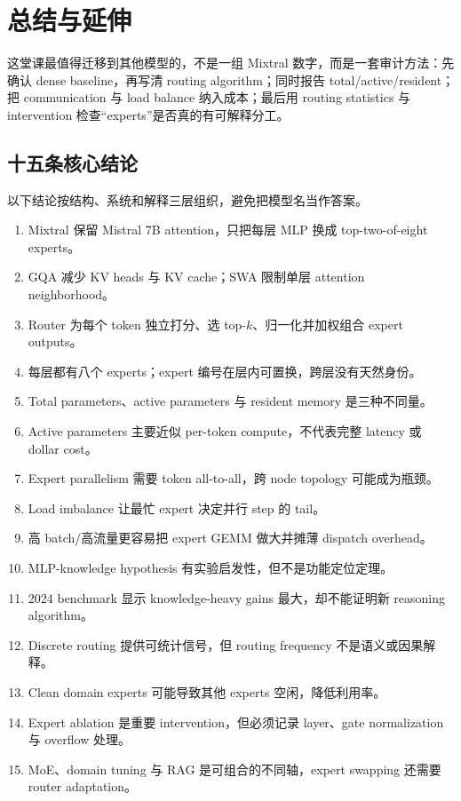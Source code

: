 \section{总结与延伸}

这堂课最值得迁移到其他模型的，不是一组 Mixtral 数字，而是一套审计方法：先确认 dense baseline，再写清 routing algorithm；同时报告 total/active/resident；把 communication 与 load balance 纳入成本；最后用 routing statistics 与 intervention 检查“experts”是否真的有可解释分工。

\subsection{十五条核心结论}

以下结论按结构、系统和解释三层组织，避免把模型名当作答案。

\begin{enumerate}
  \item Mixtral 保留 Mistral 7B attention，只把每层 MLP 换成 top-two-of-eight experts。
  \item GQA 减少 KV heads 与 KV cache；SWA 限制单层 attention neighborhood。
  \item Router 为每个 token 独立打分、选 top-$k$、归一化并加权组合 expert outputs。
  \item 每层都有八个 experts；expert 编号在层内可置换，跨层没有天然身份。
  \item Total parameters、active parameters 与 resident memory 是三种不同量。
  \item Active parameters 主要近似 per-token compute，不代表完整 latency 或 dollar cost。
  \item Expert parallelism 需要 token all-to-all，跨 node topology 可能成为瓶颈。
  \item Load imbalance 让最忙 expert 决定并行 step 的 tail。
  \item 高 batch/高流量更容易把 expert GEMM 做大并摊薄 dispatch overhead。
  \item MLP-knowledge hypothesis 有实验启发性，但不是功能定位定理。
  \item 2024 benchmark 显示 knowledge-heavy gains 最大，却不能证明新 reasoning algorithm。
  \item Discrete routing 提供可统计信号，但 routing frequency 不是语义或因果解释。
  \item Clean domain experts 可能导致其他 experts 空闲，降低利用率。
  \item Expert ablation 是重要 intervention，但必须记录 layer、gate normalization 与 overflow 处理。
  \item MoE、domain tuning 与 RAG 是可组合的不同轴，expert swapping 还需要 router adaptation。
\end{enumerate}


